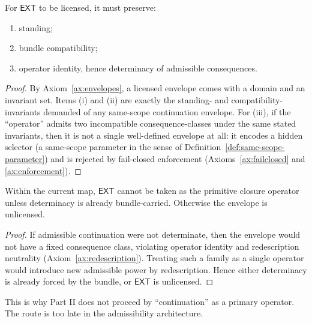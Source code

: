 \begin{lemma}\label{lem:ext-invariants}
For $\mathsf{EXT}$ to be licensed, it must preserve:
\begin{enumerate}[label=(\roman*), leftmargin=2.2em]
\item standing;
\item bundle compatibility;
\item operator identity, hence determinacy of admissible consequences.
\end{enumerate}
\end{lemma}

\begin{proof}
By Axiom~\ref{ax:envelopes}, a licensed envelope comes with a domain and an invariant set.
Items (i) and (ii) are exactly the standing- and compatibility-invariants demanded of any
same-scope continuation envelope.
For (iii), if the ``operator'' admits two incompatible consequence-classes under the same stated
invariants, then it is not a single well-defined envelope at all: it encodes a hidden selector
(a same-scope parameter in the sense of Definition~\ref{def:same-scope-parameter}) and is rejected
by fail-closed enforcement (Axioms~\ref{ax:failclosed} and \ref{ax:enforcement}).
\end{proof}

\begin{proposition}\label{prop:ext-fails}
Within the current map, $\mathsf{EXT}$ cannot be taken as the primitive closure operator unless
determinacy is already bundle-carried. Otherwise the envelope is unlicensed.
\end{proposition}

\begin{proof}
If admissible continuation were not determinate, then the envelope would not have a fixed
consequence class, violating operator identity and redescription neutrality (Axiom~\ref{ax:redescription}). Treating such a family as a
single operator would introduce new admissible power by redescription. Hence either determinacy is
already forced by the bundle, or $\mathsf{EXT}$ is unlicensed. 
\end{proof}

\begin{remark}
This is why Part II does not proceed by ``continuation'' as a primary operator. The route is too
late in the admissibility architecture.
\end{remark}



